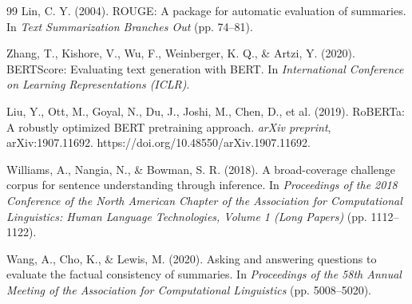 \documentclass[a4paper,fleqn]{cas-sc}
\begin{document}
\begin{thebibliography}{99}
Lin, C. Y. (2004).
ROUGE: A package for automatic evaluation of summaries.
In \textit{Text Summarization Branches Out}
(pp. 74--81).

Zhang, T., Kishore, V., Wu, F., Weinberger, K. Q.,
\& Artzi, Y. (2020).
BERTScore: Evaluating text generation with BERT.
In \textit{International Conference on Learning
Representations (ICLR)}.

Liu, Y., Ott, M., Goyal, N., Du, J., Joshi, M.,
Chen, D., et al. (2019).
RoBERTa: A robustly optimized BERT pretraining approach.
\textit{arXiv preprint}, arXiv:1907.11692.
https://doi.org/10.48550/arXiv.1907.11692.

Williams, A., Nangia, N., \& Bowman, S. R. (2018).
A broad-coverage challenge corpus for sentence understanding
through inference.
In \textit{Proceedings of the 2018 Conference of the
North American Chapter of the Association for Computational
Linguistics: Human Language Technologies,
Volume 1 (Long Papers)} (pp. 1112--1122).

Wang, A., Cho, K., \& Lewis, M. (2020).
Asking and answering questions to evaluate the factual
consistency of summaries.
In \textit{Proceedings of the 58th Annual Meeting of the
Association for Computational Linguistics}
(pp. 5008--5020).

\end{thebibliography}
\end{document}
